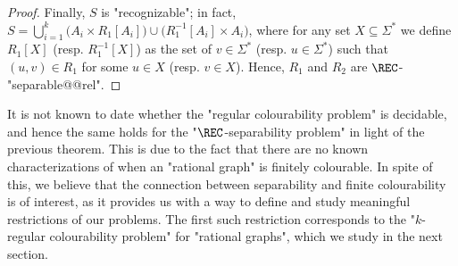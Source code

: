 \begin{proof}
    Finally, $S$ is "recognizable"; in fact, 
    $S = \bigcup_{i=1}^k \bigl( A_i \times R_1[A_i] \bigr) \cup \bigl( R_1^{-1}[A_i] \times A_i \bigr)$, 
    where for any set $X \subseteq \Sigma^*$ we define $R_1[X]$ (resp. $R_1^{-1}[X]$) as the set
    of $v\in \Sigma^*$ (resp. $u \in \Sigma^*$) such that $(u,v) \in R_1$ for some $u \in X$
    (resp. $v\in X$).
    Hence, $R_1$ and $R_2$ are $\REC$-"separable@@rel". 
\end{proof}

It is not known to date whether the "regular colourability problem" is decidable, and hence 
the same holds for the "$\REC$-separability problem"
in light of the previous theorem. This is due to the fact that there are no known characterizations of when an "rational graph" is finitely colourable. 
In spite of this, we believe that the connection between separability and finite colourability is of interest, as it provides us with a way to define and study meaningful 
restrictions of our problems. The first such restriction corresponds to the "$k$-regular colourability problem" for "rational graphs", which we study in the next section. 
